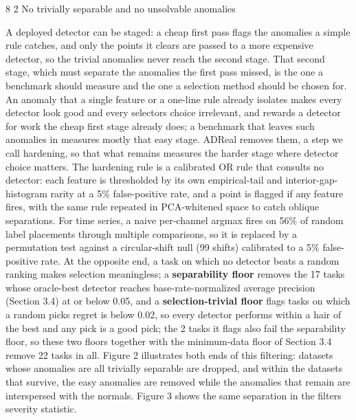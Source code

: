 \documentclass[3p,twocolumn]{elsarticle}
\makeatletter
\renewcommand\subsection{\@startsection{subsection}{2}{\z@}%
           {8\p@ \@plus 4\p@ \@minus 4\p@}%
           {2\p@ \@plus 4\p@ \@minus 3\p@}%
           {\normalfont\normalsize\itshape}}
\makeatother
\begin{document}
\vspace{2pt}


\subsection{No trivially separable and no unsolvable anomalies}\label{32-no-trivially-separable-and-no-unsolvable-anomalies}

A deployed detector can be staged: a cheap first pass flags the anomalies a simple rule catches, and only the points it clears are passed to a more expensive detector, so the trivial anomalies never reach the second stage. That second stage, which must separate the anomalies the first pass missed, is the one a benchmark should measure and the one a selection method should be chosen for. An anomaly that a single feature or a one-line rule already isolates makes every detector look good and every selector\textquotesingle s choice irrelevant, and rewards a detector for work the cheap first stage already does; a benchmark that leaves such anomalies in measures mostly that easy stage. ADReal removes them, a step we call hardening, so that what remains measures the harder stage where detector choice matters. The hardening rule is a calibrated OR rule that consults no detector: each feature is thresholded by its own empirical-tail and interior-gap-histogram rarity at a 5\% false-positive rate, and a point is flagged if any feature fires, with the same rule repeated in PCA-whitened space to catch oblique separations. For time series, a naive per-channel argmax fires on 56\% of random label placements through multiple comparisons, so it is replaced by a permutation test against a circular-shift null (99 shifts) calibrated to a 5\% false-positive rate. At the opposite end, a task on which no detector beats a random ranking makes selection meaningless; a \textbf{separability floor} removes the 17 tasks whose oracle-best detector reaches base-rate-normalized average precision (Section 3.4) at or below 0.05, and a \textbf{selection-trivial floor} flags tasks on which a random pick\textquotesingle s regret is below 0.02, so every detector performs within a hair of the best and any pick is a good pick; the 2 tasks it flags also fail the separability floor, so these two floors together with the minimum-data floor of Section 3.4 remove 22 tasks in all. Figure 2 illustrates both ends of this filtering: datasets whose anomalies are all trivially separable are dropped, and within the datasets that survive, the easy anomalies are removed while the anomalies that remain are interspersed with the normals. Figure 3 shows the same separation in the filter\textquotesingle s severity statistic.
\end{document}
